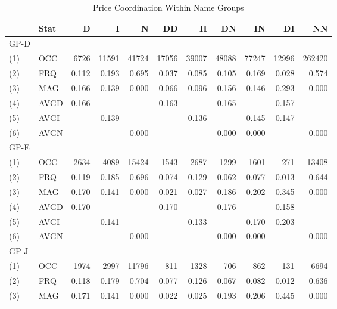 \begin{table}[H]
	\caption{Price Coordination Within Name Groups}\label{tbl1}
	\begin{tabular}{llrrrrrrrrr}
		\hline\hline
		& Stat &     D &     I &     N &    DD &    II &    DN &    IN &    DI &     NN \\ \hline\hline
		GP-D &      &       &       &       &       &       &       &       &       &        \\
		(1)  & OCC  &  6726 & 11591 & 41724 & 17056 & 39007 & 48088 & 77247 & 12996 & 262420 \\
		(2)  & FRQ  & 0.112 & 0.193 & 0.695 & 0.037 & 0.085 & 0.105 & 0.169 & 0.028 &  0.574 \\
		(3)  & MAG  & 0.166 & 0.139 & 0.000 & 0.066 & 0.096 & 0.156 & 0.146 & 0.293 &  0.000 \\
		(4)  & AVGD & 0.166 &    -- &    -- & 0.163 &    -- & 0.165 &    -- & 0.157 &     -- \\
		(5)  & AVGI &    -- & 0.139 &    -- &    -- & 0.136 &    -- & 0.145 & 0.147 &     -- \\
		(6)  & AVGN &    -- &    -- & 0.000 &    -- &    -- & 0.000 & 0.000 &    -- &  0.000 \\ \hline
		GP-E &      &       &       &       &       &       &       &       &       &        \\
		(1)  & OCC  &  2634 &  4089 & 15424 &  1543 &  2687 &  1299 &  1601 &   271 &  13408 \\
		(2)  & FRQ  & 0.119 & 0.185 & 0.696 & 0.074 & 0.129 & 0.062 & 0.077 & 0.013 &  0.644 \\
		(3)  & MAG  & 0.170 & 0.141 & 0.000 & 0.021 & 0.027 & 0.186 & 0.202 & 0.345 &  0.000 \\
		(4)  & AVGD & 0.170 &    -- &    -- & 0.170 &    -- & 0.176 &    -- & 0.158 &     -- \\
		(5)  & AVGI &    -- & 0.141 &    -- &    -- & 0.133 &    -- & 0.170 & 0.203 &     -- \\
		(6)  & AVGN &    -- &    -- & 0.000 &    -- &    -- & 0.000 & 0.000 &    -- &  0.000 \\ \hline
		GP-J &      &       &       &       &       &       &       &       &       &        \\
		(1)  & OCC  &  1974 &  2997 & 11796 &   811 &  1328 &   706 &   862 &   131 &   6694 \\
		(2)  & FRQ  & 0.118 & 0.179 & 0.704 & 0.077 & 0.126 & 0.067 & 0.082 & 0.012 &  0.636 \\
		(3)  & MAG  & 0.171 & 0.141 & 0.000 & 0.022 & 0.025 & 0.193 & 0.206 & 0.445 &  0.000 \\

\end{tabular}
\end{table}
